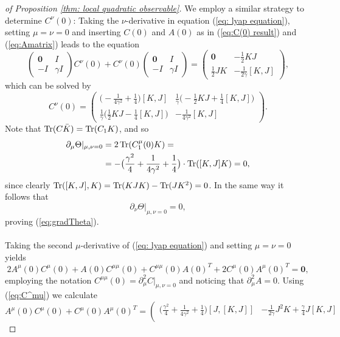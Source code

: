 \begin{proof}[of Proposition \ref{thm: local quadratic observable}]
	We employ a similar strategy to determine $C^{\nu}(0)$: Taking the
	$\nu$-derivative in equation (\ref{eq: lyap equation}), setting
	$\mu=\nu=0$ and inserting $C(0)$ and $A(0)$ as in (\ref{eq:C(0) result})
	and (\ref{eq:Amatrix}) leads to the equation
	\[
	\left(\begin{array}{cc}
	\boldsymbol{0} & I\\
	-I & \gamma I
	\end{array}\right)C^{\nu}(0)+C^{\nu}(0)\left(\begin{array}{cc}
	\boldsymbol{0} & I\\
	-I & \gamma I
	\end{array}\right)=\left(\begin{array}{cc}
	\boldsymbol{0} & -\frac{1}{2}KJ\\
	\frac{1}{2}JK & -\frac{1}{2\gamma}[K,J]
	\end{array}\right),
	\]
	which can be solved by 
	\begin{equation}
	C^{\nu}(0)=\left(\begin{array}{cc}
	\big(-\frac{1}{4\gamma^{2}}+\frac{1}{4}\big)[K,J] & \frac{1}{\gamma}\big(-\frac{1}{2}KJ+\frac{1}{4}[K,J]\big)\\
	\frac{1}{\gamma}\big(\frac{1}{2}KJ-\frac{1}{4}[K,J]\big) & -\frac{1}{4\gamma^{2}}[K,J]
	\end{array}\right).\label{eq:C^nu}
	\end{equation}
	Note that $\operatorname{Tr} (C\bar{K})=\operatorname{Tr}(C_{1}K)$, and so 
	\begin{alignat*}{1}
	\partial_{\mu}\Theta\vert_{\mu,\nu=0} & =2\operatorname{Tr}(C_{1}^{\mu}(0)K)=\\
	& =-\big(\frac{\gamma^{2}}{4}+\frac{1}{4\gamma^{2}}+\frac{1}{4}\big)\cdot\operatorname{Tr}([K,J]K)=0,
	\end{alignat*}
	since clearly $\operatorname{Tr}([K,J],K)=\operatorname{Tr}(KJK)-\operatorname{Tr}(JK^{2})=0$. In the same
	way it follows that 
	\[
	\partial_{\nu}\Theta\vert_{\mu,\nu=0}=0,
	\]
	proving (\ref{eq:gradTheta}). 
	\\\\
	Taking the second $\mu$-derivative of (\ref{eq: lyap equation})
	and setting $\mu=\nu=0$ yields
	\[
	2A^{\mu}(0)C^{\mu}(0)+A(0)C^{\mu\mu}(0)+C^{\mu\mu}(0)A(0)^{T}+2C^{\mu}(0)A^{\mu}(0)^{T}=\boldsymbol{0},
	\]
	employing the notation $C^{\mu\mu}(0)=\partial_{\mu}^{2}C\vert_{\mu,\nu=0}$
	and noticing that $\partial_{\mu}^{2}A=0$. Using (\ref{eq:C^mu})
	we calculate
	\[
	A^{\mu}(0)C^{\mu}(0)+C^{\mu}(0)A^{\mu}(0)^{T}=\left(\begin{array}{cc}
	\big(\frac{\gamma^{2}}{4}+\frac{1}{4\gamma^{2}}+\frac{1}{4}\big)[J,[K,J]] & -\frac{1}{2\gamma}J^{2}K+\frac{\gamma}{4}J[K,J]\\

\end{array}\]
\end{proof}
